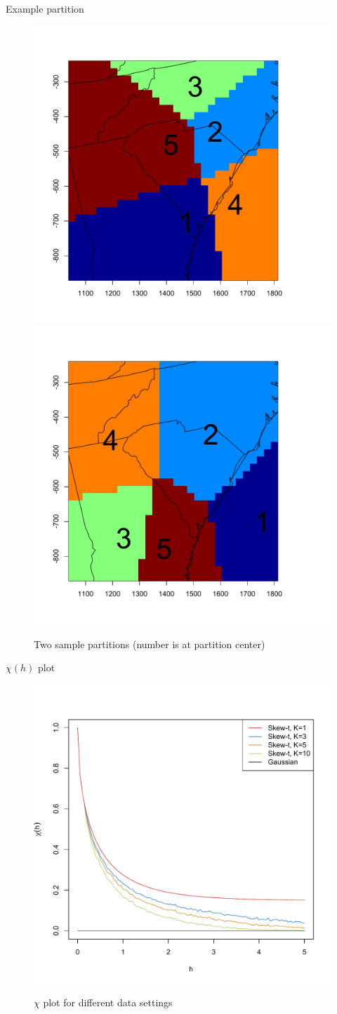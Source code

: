 \documentclass{beamer}
\begin{document}
\begin{frame}{Example partition}
    \centering
    \begin{figure}
    \includegraphics[width=0.54\linewidth, trim=0 0 0 1in]{./plots/pot/example-partition-1.pdf}
    \includegraphics[width=0.54\linewidth, trim=0 0 0 1in]{./plots/pot/example-partition-2.pdf}
    \caption{Two sample partitions (number is at partition center)}
    \end{figure}
\end{frame}

\begin{frame}{$\chi(h)$ plot}
  \vspace{-2em}
  \centering
  \begin{figure}
  \includegraphics[width=.65\linewidth]{./plots/pot/chi-h.pdf}\\[-0.2in]
  \caption{$\chi$ plot for different data settings}
  \end{figure}
\end{frame}
\end{document}

